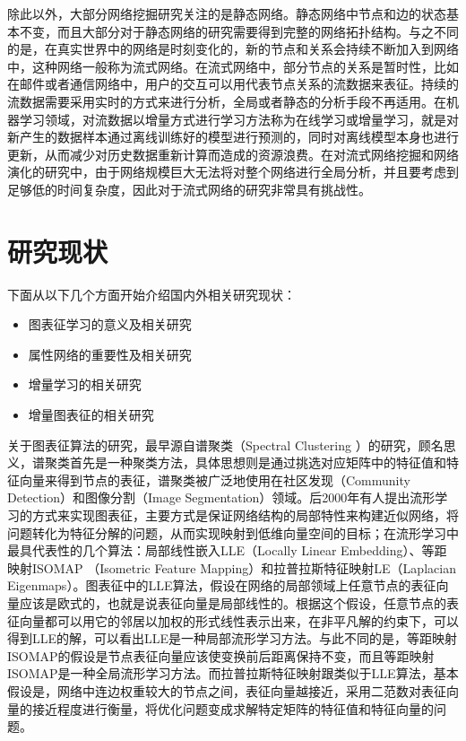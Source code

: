 除此以外，大部分网络挖掘研究关注的是静态网络。静态网络中节点和边的状态基本不变，而且大部分对于静态网络的研究需要得到完整的网络拓扑结构。与之不同的是，在真实世界中的网络是时刻变化的，新的节点和关系会持续不断加入到网络中，这种网络一般称为流式网络\cite{aggarwal2014evolutionary}。在流式网络中，部分节点的关系是暂时性，比如在邮件或者通信网络中，用户的交互可以用代表节点关系的流数据来表征。持续的流数据需要采用实时的方式来进行分析，全局或者静态的分析手段不再适用。在机器学习领域，对流数据以增量方式进行学习方法称为在线学习或增量学习，就是对新产生的数据样本通过离线训练好的模型进行预测的，同时对离线模型本身也进行更新，从而减少对历史数据重新计算而造成的资源浪费。在对流式网络挖掘和网络演化的研究中，由于网络规模巨大无法将对整个网络进行全局分析，并且要考虑到足够低的时间复杂度，因此对于流式网络的研究非常具有挑战性\cite{zhao2011gsketch,le2012linked}。

\section{研究现状}
下面从以下几个方面开始介绍国内外相关研究现状：
\begin{itemize}
\item {图表征学习的意义及相关研究}
\item {属性网络的重要性及相关研究}
\item {增量学习的相关研究}
\item {增量图表征的相关研究}

\end{itemize}

关于图表征算法的研究，最早源自谱聚类（Spectral Clustering ）的研究，顾名思义，谱聚类首先是一种聚类方法，具体思想则是通过挑选对应矩阵中的特征值和特征向量来得到节点的表征，谱聚类被广泛地使用在社区发现（Community Detection）\cite{leskovec2010empirical}和图像分割（Image Segmentation）\cite{shi2000normalized}领域。后2000年有人提出流形学习的方式来实现图表征，主要方式是保证网络结构的局部特性来构建近似网络，将问题转化为特征分解的问题，从而实现映射到低维向量空间的目标；在流形学习中最具代表性的几个算法：局部线性嵌入LLE\cite{roweis2000nonlinear}（Locally Linear Embedding）、等距映射ISOMAP\cite{tenenbaum2000global} （Isometric Feature Mapping）和拉普拉斯特征映射LE\cite{belkin2002laplacian}（Laplacian Eigenmaps）。图表征中的LLE算法，假设在网络的局部领域上任意节点的表征向量应该是欧式的，也就是说表征向量是局部线性的。根据这个假设，任意节点的表征向量都可以用它的邻居以加权的形式线性表示出来，在非平凡解的约束下，可以得到LLE的解，可以看出LLE是一种局部流形学习方法。与此不同的是，等距映射ISOMAP的假设是节点表征向量应该使变换前后距离保持不变，而且等距映射ISOMAP是一种全局流形学习方法。而拉普拉斯特征映射跟类似于LLE算法，基本假设是，网络中连边权重较大的节点之间，表征向量越接近，采用二范数对表征向量的接近程度进行衡量，将优化问题变成求解特定矩阵的特征值和特征向量的问题。

